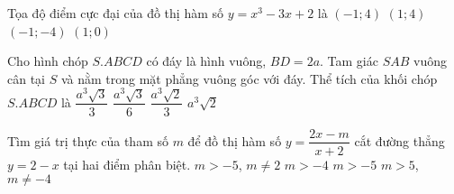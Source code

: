 \begin{ex}%
	Tọa độ điểm cực đại của đồ thị hàm số $y={{x}^{3}}-3x+2$ là
	\choice
	{\True $\left( -1;4 \right)$}
	{$\left( 1;4 \right)$}
	{$\left( -1;-4 \right)$}
	{$\left( 1;0 \right)$}
\end{ex}
\begin{ex}%
	Cho hình chóp $S.ABCD$ có đáy là hình vuông, $BD=2a$. Tam giác $SAB$ vuông cân tại $S$ và nằm trong mặt phẳng vuông góc với đáy. Thể tích của khối chóp $S.ABCD$ là 
	\choice
	{$\dfrac{{{a}^{3}}\sqrt{3}}{3}$}
	{$\dfrac{{{a}^{3}}\sqrt{3}}{6}$}
	{\True $\dfrac{{{a}^{3}}\sqrt{2}}{3}$}
	{${{a}^{3}}\sqrt{2}$}
\end{ex}
\begin{ex}%
	Tìm giá trị thực của tham số $m$ để đồ thị hàm số $y=\dfrac{2x-m}{x+2}$ cắt đường thẳng $y=2-x$ tại hai điểm phân biệt.
	\choice
	{$m>-5$, $m\ne 2$}
	{$m>-4$}
	{$m>-5$}
	{\True $m>5$, $m\ne -4$}
\end{ex}

